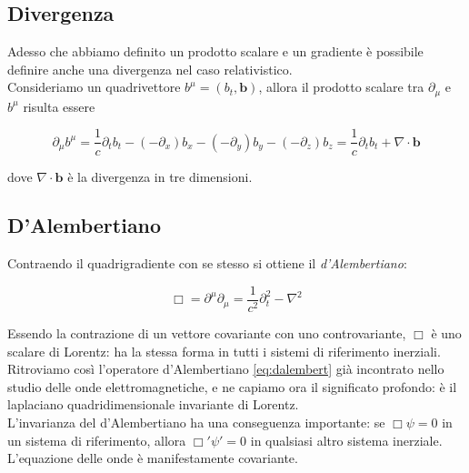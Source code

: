 \subsection{Divergenza}

Adesso che abbiamo definito un prodotto scalare e un gradiente è possibile definire anche una divergenza nel caso relativistico. \\

Consideriamo un quadrivettore $b^{\mu} = (b_t, \mathbf{b})$, allora il prodotto scalare tra $\partial_{\mu}$ e $b^{\mu}$ risulta essere 

\begin{tcolorbox}[colback=yellow!10!white, colframe=orange!70!black, boxrule=0.8pt]
\begin{equation}\label{eq:divergenze_relatività}
    \partial_{\mu} b^{\mu} = \frac{1}{c} \partial_t b_t - (-\partial_x)b_x - (-\partial_y)b_y - (-\partial_z)b_z = \frac{1}{c} \partial_t b_t + \nabla \cdot \mathbf{b}
\end{equation}
\end{tcolorbox}

dove $\nabla \cdot \mathbf{b}$ è la divergenza in tre dimensioni. 

\subsection{D'Alembertiano}

Contraendo il quadrigradiente con se stesso si ottiene il \emph{d'Alembertiano}:

\begin{tcolorbox}[colback=yellow!10!white, colframe=orange!70!black, boxrule=0.8pt]
\begin{equation}
    \Box = \partial^\mu\partial_\mu = 
    \frac{1}{c^2}\partial_t^2 - \nabla^2
\end{equation}
\end{tcolorbox}

Essendo la contrazione di un vettore covariante con uno controvariante, $\Box$ è uno scalare di Lorentz: ha la stessa forma in tutti i sistemi di riferimento inerziali. 
Ritroviamo così l'operatore d'Alembertiano \eqref{eq:dalembert} già incontrato nello studio delle onde elettromagnetiche, e ne capiamo ora il significato profondo: è il laplaciano quadridimensionale invariante di Lorentz.\\

L'invarianza del d'Alembertiano ha una conseguenza importante: se $\Box\psi = 0$ in un sistema di riferimento, allora $\Box'\psi' = 0$ in qualsiasi altro sistema inerziale. 
L'equazione delle onde è manifestamente covariante.\\

